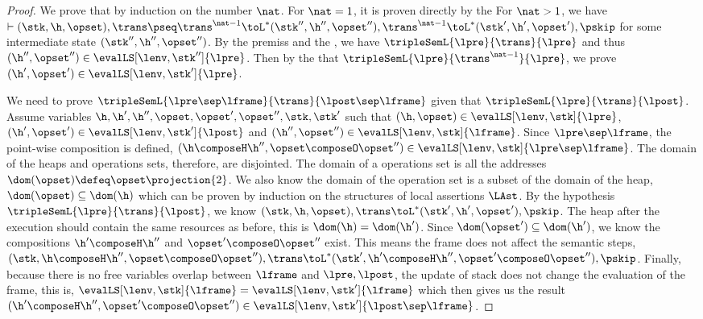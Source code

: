 \begin{proof}
We prove that by induction on the number \( \nat \).
For \( \nat = 1 \), it is proven directly by the \ih
For \( \nat > 1 \), we have \( \vdash (\stk, \h, \opset), \trans \pseq \trans^{\nat - 1} \toL^{*} (\stk'', \h'', \opset''), \trans^{\nat - 1} \toL^{*} (\stk', \h', \opset'), \pskip \) for some intermediate state \( ( \stk'', \h'', \opset'' ) \).
By the premiss and the \ih, we have \(\tripleSemL{\lpre}{\trans}{\lpre} \) and thus \(  (\h'', \opset'') \in \evalLS[\lenv, \stk'']{\lpre} \).
Then by the \ih that \(\tripleSemL{\lpre}{\trans^{\nat - 1}}{\lpre} \), we prove \(  (\h', \opset') \in \evalLS[\lenv, \stk']{\lpre} \).


We need to prove \( \tripleSemL{\lpre \sep \lframe }{\trans}{\lpost \sep \lframe} \) given that \( \tripleSemL{\lpre}{\trans}{\lpost} \).
Assume variables \( \h, \h', \h'', \opset, \opset', \opset'', \stk, \stk' \) such that \( ( \h, \opset ) \in \evalLS[\lenv, \stk]{\lpre} \), \( ( \h', \opset' ) \in \evalLS[\lenv, \stk']{\lpost} \) and \( ( \h'', \opset'' ) \in \evalLS[\lenv, \stk]{\lframe}\).
Since \( \lpre \sep \lframe \), the point-wise composition is defined, \ie \( (\h \composeH \h'', \opset \composeO \opset'') \in \evalLS[\lenv, \stk]{\lpre \sep \lframe} \).
The domain of the heaps and operations sets, therefore, are disjointed.
The domain of a operations set is all the addresses \( \dom(\opset) \defeq \opset\projection{2}\).
We also know the domain of the operation set is a subset of the domain of the heap, \(\dom(\opset) \subseteq \dom(\h) \) which can be proven by induction on the structures of local assertions \( \LAst \).
By the hypothesis \( \tripleSemL{\lpre}{\trans}{\lpost} \), we know \( ( \stk, \h, \opset ), \trans \toL^{*} ( \stk', \h', \opset' ), \pskip \).
The heap after the execution should contain the same resources as before, this is \( \dom(\h) = \dom(\h') \).
Since \( \dom(\opset') \subseteq \dom(\h') \), we know the compositions \( \h' \composeH \h''\) and \( \opset' \composeO \opset''\) exist.
This means the frame does not affect the semantic steps, \ie \( ( \stk, \h \composeH \h'', \opset \composeO \opset''), \trans \toL^{*} ( \stk', \h' \composeH \h'', \opset' \composeO \opset'' ), \pskip \).
Finally, because there is no free variables overlap between \( \lframe \) and \( \lpre, \lpost \), the update of stack does not change the evaluation of the frame, this is, \( \evalLS[\lenv, \stk]{\lframe} = \evalLS[\lenv, \stk']{\lframe} \) which then gives us the result \( (\h' \composeH \h'', \opset' \composeO \opset'') \in \evalLS[\lenv, \stk']{\lpost \sep \lframe} \).



\end{proof}
